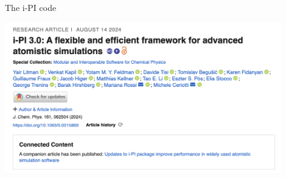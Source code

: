 \documentclass[aspectratio=169]{beamer}
\begin{document}
\begin{frame}
\begin{columns}[c]
        \begin{column}{0.35\textwidth}
            \vspace*{1em}
            
        \end{column}

    \end{columns}
\end{frame}

\begin{frame}{The i-PI code}
\begin{center}
    \includegraphics[width=0.9\textwidth]{graphics/ipi-paper.png}
\end{center}
\end{frame}
\end{document}
